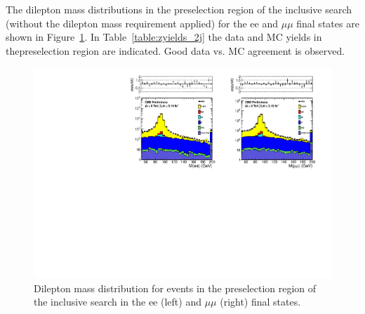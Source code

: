 The dilepton mass distributions in the preselection region of the inclusive search (without the dilepton mass requirement applied) 
for the ee and $\mu\mu$ final states are shown in Figure~\ref{fig:dilmass_2j}. In Table~\ref{table:zyields_2j} the data and MC yields 
in thepreselection region are indicated. Good data vs. MC agreement is observed.


\begin{figure}[hbt]
  \begin{center}
	\includegraphics[width=1.0\linewidth]{plots/dilmass_ee_mm_2j.pdf}
	\caption{
	  \label{fig:dilmass_2j}\protect 
	  Dilepton mass distribution for events in the preselection region of the inclusive search
	  in the ee (left) and $\mu\mu$ (right) final states.}
  \end{center}
\end{figure}

